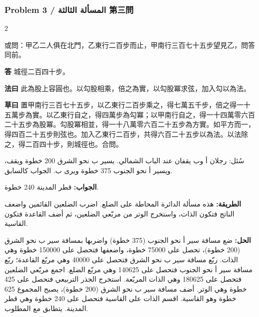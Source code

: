 \documentclass[11pt,a4paper]{article}
\newcommand{\ar}[1]{\arabicfont\beginR #1\endR}
\newcommand{\Answer}[1]{\par\noindent\textbf{\color{problemcolor}答} #1\par}
\newcommand{\Method}[1]{\par\noindent\textbf{\color{problemcolor}法曰} #1\par}
\newcommand{\Workings}[1]{\par\noindent\textbf{\color{problemcolor}草曰} #1\par}
\newcommand{\AnswerAr}{\par\noindent\textbf{\color{problemcolor}\ar{الجواب:}} }
\newcommand{\MethodAr}{\par\noindent\textbf{\color{problemcolor}\ar{الطريقة:}} }
\newcommand{\WorkingsAr}{\par\noindent\textbf{\color{problemcolor}\ar{الحل:}} }
\begin{document}
\vspace{0.5cm}

\subsubsection*{Problem 3 / \ar{المسألة الثالثة} \quad 第三問}

\begin{paracol}{2}

\noindent 或問：甲乙二人俱在北門，乙東行二百步而止，甲南行三百七十五步望見乙，問答同前。

\vspace{0.2cm}

\Answer{城徑二百四十步。}

\vspace{0.2cm}

\Method{此為股上容圓也。以勾股相乘，倍之為實，以勾股冪求弦，加入勾以為法。}

\vspace{0.2cm}

\Workings{置甲南行三百七十五步，以乙東行二百步乘之，得七萬五千步，倍之得一十五萬步為實。以乙東行自之，得四萬步為勾冪；以甲南行自之，得一十四萬零六百二十五步為股冪。勾股冪相並，得一十八萬零六百二十五步為方實。如平方而一，得四百二十五步則弦也。加入乙東行二百步，共得六百二十五步以為法。以法除之，得二百四十步，則城徑也。合問。}

\switchcolumn

\ar{سُئل: رجلان أ وب يقفان عند الباب الشمالي. يسير ب نحو الشرق 200 خطوة ويقف، ويسير أ نحو الجنوب 375 خطوة ويرى ب. الجواب كالسابق.}

\vspace{0.2cm}

\AnswerAr{قطر المدينة 240 خطوة.}

\vspace{0.2cm}

\MethodAr{هذه مسألة الدائرة المحاطة على الضلع. اضرب الضلعين القائمين واضعف الناتج فتكون الذات، واستخرج الوتر من مربّعي الضلعين، ثم أضف القاعدة فتكون القاسية.}

\vspace{0.2cm}

\WorkingsAr{ضع مسافة سير أ نحو الجنوب (375 خطوة) واضربها بمسافة سير ب نحو الشرق (200 خطوة)، تحصل على 75000 خطوة، واضعفها فتحصل على 150000 خطوة وهي الذات. ربّع مسافة سير ب نحو الشرق فتحصل على 40000 وهي مربّع القاعدة؛ ربّع مسافة سير أ نحو الجنوب فتحصل على 140625 وهي مربّع الضلع. اجمع مربّعي الضلعين فتحصل على 180625 وهي الذات المربّعة. استخرج الجذر التربيعي فتحصل على 425 خطوة وهي الوتر. أضف مسافة سير ب نحو الشرق (200 خطوة)، يصبح المجموع 625 خطوة وهو القاسية. اقسم الذات على القاسية فتحصل على 240 خطوة وهي قطر المدينة. يتطابق مع المطلوب.}

\end{paracol}
\end{document}
